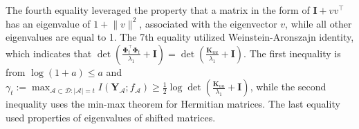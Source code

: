 The fourth equality leveraged the property that a matrix in the form of $\mathbf{I} + vv^\top$ has an eigenvalue of $1 + \lVert v \rVert^2$, associated with the eigenvector $v$, while all other eigenvalues are equal to 1. The 7th equality utilized Weinstein-Aronszajn identity, which indicates that $\det(\frac{\boldsymbol{\Phi}_t^\top \boldsymbol{\Phi}_t}{\lambda_1} + \mathbf{I}) = \det(\frac{\mathbf{K}_{uu}}{\lambda_1} + \mathbf{I})$. The first inequality is from $\log(1+a) \le a$ and $\gamma_t := \max_{\mathcal{A} \subset \mathcal{D}: \lvert \mathcal{A} \rvert=t} I(\mathbf{Y}_\mathcal{A}; f_\mathcal{A}) \ge \frac{1}{2}\log \det(\frac{\mathbf{K}_{uu}}{\lambda_1} + \mathbf{I})$, while the second inequality uses the min-max theorem for Hermitian matrices. The last equality used properties of eigenvalues of shifted matrices. 




